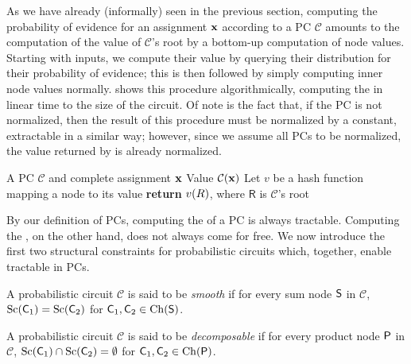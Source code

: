 As we have already (informally) seen in the previous section, computing the probability of evidence
for an assignment $\mathbf{x}$ according to a PC $\mathcal{C}$ amounts to the computation of the value
of $\mathcal{C}$'s root by a bottom-up computation of node values. Starting with inputs, we compute
their value by querying their distribution for their probability of evidence; this is then
followed by simply computing inner node values normally.  shows this procedure
algorithmically, computing the \evi{} in linear time to the size of the circuit. Of note is the
fact that, if the PC is not normalized, then the result of this procedure must be normalized by a
constant, extractable in a similar way; however, since we assume all PCs to be normalized, the
value returned by  is already normalized.

\begin{algorithm}[t]
  \caption{\evi}\label{alg:evi}
  \begin{algorithmic}[1]
    \Require A PC $\mathcal{C}$ and complete assignment $\mathbf{x}$
    \Ensure Value $\mathcal{C}(\mathbf{x})$
    \State Let $v$ be a hash function mapping a node to its value
    \EndFor%
    \State \textbf{return} $v(\normalfont{R})$, where $\textsf{R}$ is $\mathcal{C}$'s root
  \end{algorithmic}
\end{algorithm}

By our definition of PCs, computing the \evi{} of a PC is always tractable. Computing the \mar{},
on the other hand, does not always come for free. We now introduce the first two structural
constraints for probabilistic circuits which, together, enable tractable \mar{} in PCs.

\begin{definition}[Smoothness]
  A probabilistic circuit $\mathcal{C}$ is said to be \emph{smooth} if for every sum node $\operatorname{\textup{\textsf{S}}}$ in
  $\mathcal{C}$, $\operatorname*{\normalfont{Sc}}(\operatorname{\textup{\textsf{C}}}_1)=\operatorname*{\normalfont{Sc}}(\operatorname{\textup{\textsf{C}}}_2)$ for $\operatorname{\textup{\textsf{C}}}_1,\operatorname{\textup{\textsf{C}}}_2\in\operatorname*{\normalfont{Ch}}(\operatorname{\textup{\textsf{S}}})$.
\end{definition}

\begin{definition}[Decomposability]
  A probabilistic circuit $\mathcal{C}$ is said to be \emph{decomposable} if for every product node
  $\operatorname{\textup{\textsf{P}}}$ in $\mathcal{C}$, $\operatorname*{\normalfont{Sc}}(\operatorname{\textup{\textsf{C}}}_1)\cap\operatorname*{\normalfont{Sc}}(\operatorname{\textup{\textsf{C}}}_2)=\emptyset$ for $\operatorname{\textup{\textsf{C}}}_1,\operatorname{\textup{\textsf{C}}}_2\in
  \operatorname*{\normalfont{Ch}}(\operatorname{\textup{\textsf{P}}})$.
\end{definition}

